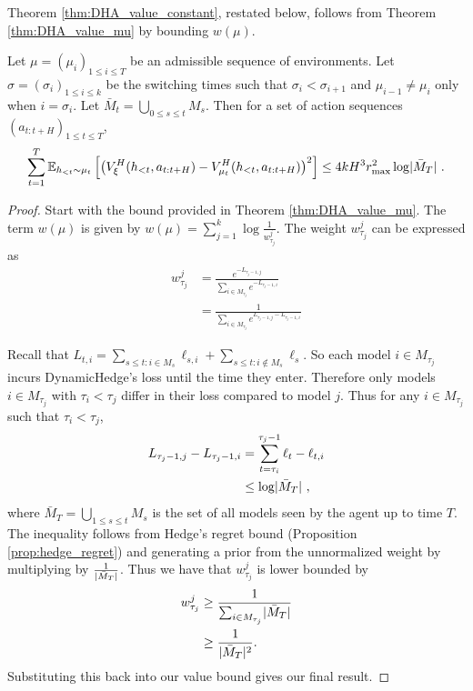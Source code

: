     Theorem \ref{thm:DHA_value_constant}, restated below, follows from Theorem \ref{thm:DHA_value_mu} by bounding $w(\mu)$.
    
    \begin{T2}
        Let $\mu = (\mu_i)_{1 \leq i \leq T}$ be an admissible sequence of environments. Let $\sigma = (\sigma_i)_{1 \leq i \leq k}$ be the switching times such that $\sigma_i < \sigma_{i+1}$ and $\mu_{i-1} \neq \mu_{i}$ only when $i = \sigma_{i}$.
        Let $\bar{M}_t = \bigcup_{0 \leq s \leq t} M_s$. 
        Then for a set of action sequences $(a_{t:t+H})_{1\leq t \leq T}$,
        \begin{align}
            \sum_{t=1}^{T} \mathbb{E}_{h_{<t} \sim \mu_t} \left[ \left( V_{\xi}^{H}(h_{<t}, a_{t:t+H}) - V_{\mu_{t}}^{H}(h_{<t}, a_{t:t+H}) \right)^2 \right] \leq 4 k H^3 r_{\max}^2 \log \lvert \bar{M}_T \rvert~.
        \end{align}
    \end{T2}
    
    \begin{proof}
        Start with the bound provided in Theorem \ref{thm:DHA_value_mu}. The term $w(\mu)$ is given by ${w(\mu) = \sum_{j=1}^{k} \log \frac{1}{w_{\tau_j}^j}}$. The weight $w_{\tau_j}^j$ can be expressed as
        \begin{align*}
            w_{\tau_j}^j &= \frac{ e^{-L_{\tau_j-1, j}} }{ \sum_{i \in M_{\tau_j}} e^{-L_{\tau_j-1, i}} }\\
            &= \frac{ 1 }{ \sum_{i \in M_{\tau_j}} e^{L_{\tau_j-1, j}-L_{\tau_j-1, i}} }
        \end{align*}
    
        Recall that $L_{t, i} = \sum_{s \leq t: i \in M_s} \ell_{s, i} + \sum_{s \leq t: i \notin M_s} \ell_s$. So each model $i \in M_{\tau_j}$ incurs DynamicHedge's loss until the time they enter. Therefore only models $i \in M_{\tau_j}$ with $\tau_i < \tau_j$ differ in their loss compared to model $j$. Thus for any $i \in M_{\tau_j}$ such that $\tau_i < \tau_j$,
        \begin{align*}
            L_{\tau_j - 1, j} - L_{\tau_j - 1, i} &= \sum_{t = \tau_i}^{\tau_j - 1} \ell_t - \ell_{t,i}\\
            &\leq \log \lvert \bar{M}_T \rvert~,
        \end{align*}
        where $\bar{M}_T = \bigcup_{1 \leq s \leq t} M_s$ is the set of all models seen by the agent up to time $T$. The inequality follows from Hedge's regret bound (Proposition \ref{prop:hedge_regret}) and generating a prior from the unnormalized weight by multiplying by $\frac{1}{\lvert \bar{M}_T \rvert}$. Thus we have that $w_{\tau_j}^j$ is lower bounded by
        \begin{align*}
            w_{\tau_j}^j &\geq \frac{1}{\sum_{i \in M_{\tau_j}} \lvert \bar{M}_T \rvert}\\
            &\geq \frac{1}{\lvert \bar{M}_T \rvert^2}.
        \end{align*}
        Substituting this back into our value bound gives our final result.
    \end{proof}
    
